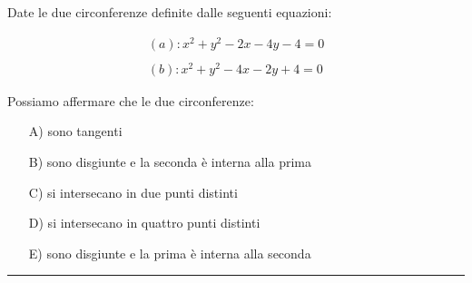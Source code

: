 \begin{enumerate}
Date le due circonferenze definite dalle seguenti equazioni:

\[
\begin{split}
(a): x^2+y^2-2x-4y-4=0 \\
\\
(b): x^2+y^2-4x-2y+4=0
\end{split}
\]

Possiamo affermare che le due circonferenze:

\begin{itemize}
\item[A)] sono tangenti
\item[B)] sono disgiunte e la seconda è interna alla prima
\item[C)] si intersecano in due punti distinti
\item[D)] si intersecano in quattro punti distinti
\item[E)] sono disgiunte e la prima è interna alla seconda
\end{itemize}



\vspace{1cm}
\hrule
\vspace{1cm}


%
%
%
%
%
%
%
%
%
%
%
%


\end{enumerate}

\pagebreak

